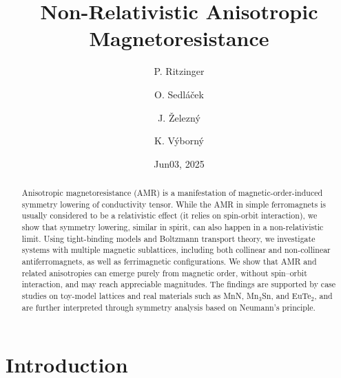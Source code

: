 \documentclass[prb,showpacs,amsmath,amssymb,superscriptaddress,twocolumn,floatfix]{revtex4-1}
\begin{document}
\title{Non-Relativistic Anisotropic Magnetoresistance}

\author{P. Ritzinger}

\author{O. Sedl\'a\v cek}
\author{J. \v Zelezn\'y}

\author{K. V\'yborn\'y}


\date{Jun03, 2025}

\begin{abstract}
Anisotropic magnetoresistance (AMR) is a manifestation of
magnetic-order-induced symmetry lowering of conductivity tensor. While the AMR in simple ferromagnets is usually considered to be a relativistic effect (it relies on spin-orbit interaction), we show that symmetry lowering, similar in spirit, can also happen in a non-relativistic limit. Using tight-binding models and Boltzmann transport theory, we investigate systems with multiple magnetic sublattices, including both collinear and non-collinear antiferromagnets, as well as ferrimagnetic configurations. We show that AMR and related anisotropies can emerge purely from magnetic order, without spin–orbit interaction, and may reach appreciable magnitudes. The findings are supported by case studies on toy-model lattices and real materials such as MnN, Mn$_3$Sn, and EuTe$_2$, and are further interpreted through symmetry analysis based on Neumann’s principle.
\end{abstract}


\maketitle


\section{Introduction}
\end{document}
